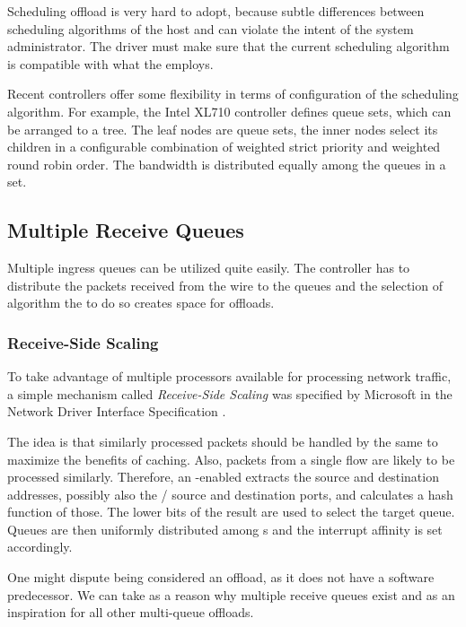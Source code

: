 Scheduling offload is very hard to adopt, because subtle differences between
scheduling algorithms of the host and  can violate the intent of the
system administrator. The  driver must make sure that the current
scheduling algorithm is compatible with what the  employs.

Recent controllers offer some flexibility in terms of configuration of the
scheduling algorithm. For example, the Intel XL710 controller \cite{XL710}
defines queue sets, which can be arranged to a tree. The leaf nodes are queue sets,
the inner nodes select its children in a configurable combination of weighted
strict priority and weighted round robin order. The bandwidth is distributed
equally among the queues in a set.

\subsection{Multiple Receive Queues}

Multiple ingress queues can be utilized quite
easily. The controller has to distribute the packets received from the wire to
the queues and the selection of algorithm the to do so creates space for offloads.

\subsubsection{Receive-Side Scaling}

To take advantage of multiple processors available for processing
network traffic, a simple mechanism called \emph{Receive-Side Scaling} was
specified by Microsoft in the Network Driver Interface Specification \cite{NDIS}.

The idea is that similarly processed packets should be handled by the same
 to maximize the benefits of caching. Also, packets from a single flow are
likely to be processed similarly. Therefore, an -enabled 
extracts the source and destination addresses, possibly also the /
source and destination ports, and calculates a hash function of those. The lower
bits of the result are used to select the target queue. Queues are then uniformly
distributed among s and the interrupt affinity is set accordingly.

One might dispute  being considered an offload, as it does not have a
software predecessor. We can take  as a reason why multiple receive queues
exist and as an inspiration for all other multi-queue offloads.

